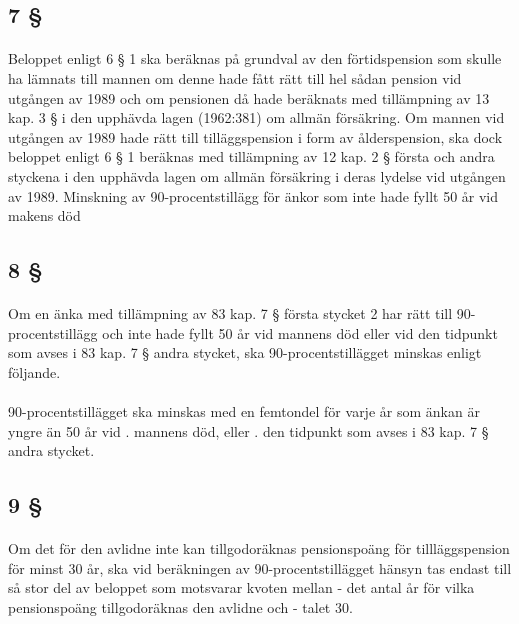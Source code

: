 \documentclass[a4paper,notitlepage,openany,10pt]{book}
\begin{document}
\subsection*{7 §}
\paragraph*{}
Beloppet enligt 6 § 1 ska beräknas på grundval av den förtidspension som skulle ha lämnats till mannen om denne hade fått rätt till hel sådan pension vid utgången av 1989 och om pensionen då hade beräknats med tillämpning av 13 kap. 3 § i den upphävda lagen (1962:381) om allmän försäkring.
Om mannen vid utgången av 1989 hade rätt till tilläggspension i form av ålderspension, ska dock beloppet enligt 6 § 1 beräknas med tillämpning av 12 kap. 2 § första och andra styckena i den upphävda lagen om allmän försäkring i deras lydelse vid utgången av 1989.
Minskning av 90-procentstillägg för änkor som inte hade fyllt 50 år vid makens död
\subsection*{8 §}
\paragraph*{}
Om en änka med tillämpning av 83 kap. 7 § första stycket 2 har rätt till 90-procentstillägg och inte hade fyllt 50 år vid mannens död eller vid den tidpunkt som avses i 83 kap. 7 § andra stycket, ska 90-procentstillägget minskas enligt följande.
\paragraph*{}
90-procentstillägget ska minskas med en femtondel för varje år som änkan är yngre än 50 år vid
. mannens död, eller
. den tidpunkt som avses i 83 kap. 7 § andra stycket.
\subsection*{9 §}
\paragraph*{}
Om det för den avlidne inte kan tillgodoräknas pensionspoäng för tillläggspension för minst 30 år, ska vid beräkningen av 90-procentstillägget hänsyn tas endast till så stor del av beloppet som motsvarar kvoten mellan
\newline - det antal år för vilka pensionspoäng tillgodoräknas den avlidne och
\newline - talet 30.
\end{document}
